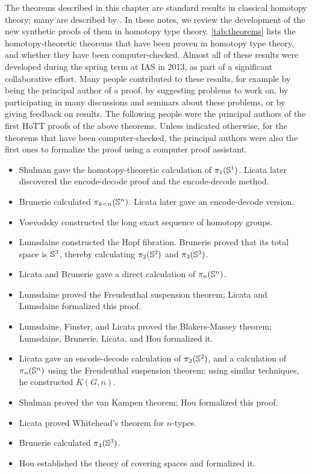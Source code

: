 The theorems described in this chapter are standard results in classical
homotopy theory; many are described by \cite{hatcher02topology}.  In these
notes, we review the development of the new synthetic proofs of them in homotopy
type theory.  \autoref{tab:theorems} lists the homotopy-theoretic
theorems that have been proven in homotopy type theory, and whether they
have been computer-checked.
Almost all of these results were developed during the spring term at IAS
in 2013, as part of a significant collaborative effort.  Many people
contributed to these results, for example by being the principal author
of a proof, by suggesting problems to work on, by participating in many
discussions and seminars about these problems, or by giving feedback on
results.  The following people were the principal authors of the first
HoTT proofs of the above theorems. Unless indicated otherwise, for the
theorems that have been computer-checked, the principal authors were
also the first ones to formalize the proof using a computer proof
assistant.
\begin{itemize}
\item 
Shulman gave the homotopy-theoretic calculation of $\pi_1(\mathbb{S}^1)$.  Licata later discovered the
encode-decode proof and the encode-decode
method.

\item 
Brunerie calculated $\pi_{k<n}(\mathbb{S} ^ n)$.
Licata later gave an encode-decode version.

\item Voevodsky constructed the long exact sequence of
  homotopy groups. 

\item Lumsdaine constructed the Hopf fibration.
  Brunerie proved that its total space is $\mathbb{S} ^3$, thereby calculating $\pi_2(\mathbb{S} ^2)$ and
  $\pi_3(\mathbb{S} ^3)$.

\item Licata and Brunerie gave a direct calculation of
$\pi_n(\mathbb{S} ^n)$.  

\item 
  Lumsdaine proved the Freudenthal suspension theorem; Licata and
  Lumsdaine formalized this proof.
\item Lumsdaine, Finster, and Licata proved the Blakers-Massey theorem;
  Lumsdaine, Brunerie, Licata, and Hou formalized it.

\item 
Licata gave an encode-decode calculation of $\pi_2(\mathbb{S} ^2)$, and a
calculation of $\pi_n(\mathbb{S} ^n)$ using the Freudenthal suspension theorem; using similar
techniques, he constructed $K(G,n)$.

\item 
Shulman proved the van Kampen theorem; Hou formalized this proof.

\item 
Licata proved Whitehead's theorem for $n$-types.

\item Brunerie calculated $\pi_4(\mathbb{S} ^3)$.

\item 
Hou established the theory of covering spaces and formalized it.
\end{itemize}

